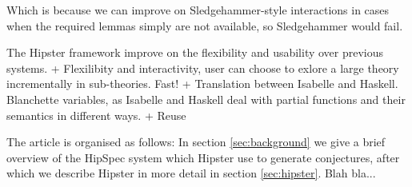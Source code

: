Which is because we can improve on Sledgehammer-style interactions in cases when the required lemmas simply are not available, so Sledgehammer would fail. 

The Hipster framework improve on the flexibility and usability over previous systems. 
 + Flexilibity and interactivity, user can choose to exlore a large theory incrementally in sub-theories. Fast!
+ Translation between Isabelle and Haskell.  Blanchette variables, as Isabelle and Haskell deal with partial functions and their semantics in different ways.  
+ Reuse 

The article is organised as follows: In section \ref{sec:background} we give a brief overview of the HipSpec system which Hipster use to generate conjectures, after which we describe Hipster in more detail in section \ref{sec:hipster}. Blah bla... 
